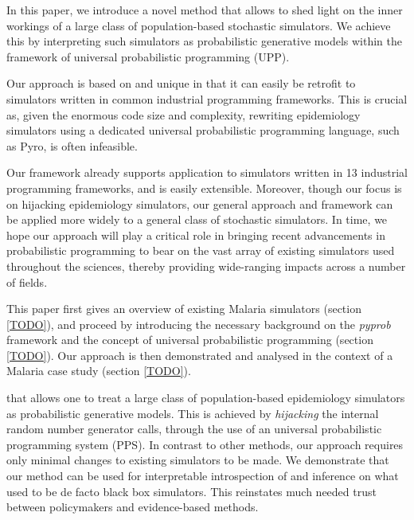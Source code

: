 \documentclass{article}
\begin{document}
In this paper, we introduce a novel method that allows to shed light on the inner workings of a large class of population-based stochastic simulators. We achieve this by interpreting such simulators as probabilistic generative models within the framework of universal probabilistic programming (UPP)\cite{TODO}. 

Our approach is based on \cite{TODO} and unique in that it can easily be retrofit to simulators written in common industrial programming frameworks. This is crucial as, given the enormous code size and complexity, rewriting epidemiology simulators using a dedicated universal probabilistic programming language, such as Pyro\cite{}, is often infeasible.
 

Our framework already supports application to simulators written in 13 industrial programming frameworks, and is easily extensible. 
Moreover, though our focus is on hijacking epidemiology simulators, our general approach and framework can be applied more widely to a general class of stochastic simulators.  
In time, we hope our approach will play a critical role in
bringing recent advancements in probabilistic programming to bear on
the vast array of existing simulators used throughout the sciences,
thereby providing wide-ranging impacts across a number of fields.

This paper first gives an overview of existing Malaria simulators (section \ref{TODO}), and proceed by introducing the necessary background on the \textit{pyprob} framework and the concept of universal probabilistic programming (section \ref{TODO}). Our approach is then demonstrated and analysed in the context of a Malaria case study (section \ref{TODO}). 

that allows one to treat a large class of population-based epidemiology simulators as probabilistic generative models. This is achieved by \emph{hijacking} the internal random number generator calls, through the use of an universal probabilistic programming system (PPS). In contrast to other methods, our approach requires only minimal changes to existing simulators to be made. 
We demonstrate that our method can be used for interpretable introspection of and inference on what used to be de facto black box simulators. This reinstates much needed trust between policymakers and evidence-based methods. 


\end{document}
